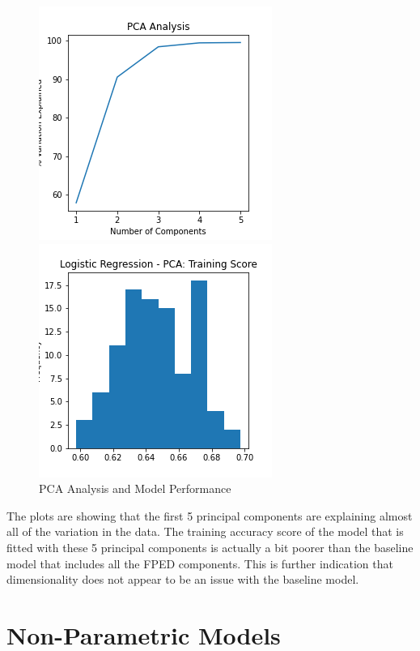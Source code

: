 \documentclass{article}
\begin{document}
\begin{figure}[htb]
\begin{minipage}[b]{.48\linewidth}
  \centering
  \centerline{\includegraphics[scale=0.4]{PCA_Analysis.png}}
\end{minipage}
\hfill
\begin{minipage}[b]{0.48\linewidth}
  \centering
  \centerline{\includegraphics[scale=0.4]{Log_Reg_PCA_Training_Score.png}}
\end{minipage}
\caption{PCA Analysis and Model Performance}
\label{fig:res}
\end{figure}

The plots are showing that the first 5 principal components are explaining almost all of the variation in the data. The training accuracy score of the model that is fitted with these 5 principal components is actually a bit poorer than the baseline model that includes all the FPED components. This is further indication that dimensionality does not appear to be an issue with the baseline model.

\section{Non-Parametric Models}
\label{sec:pagestyle}
\end{document}
